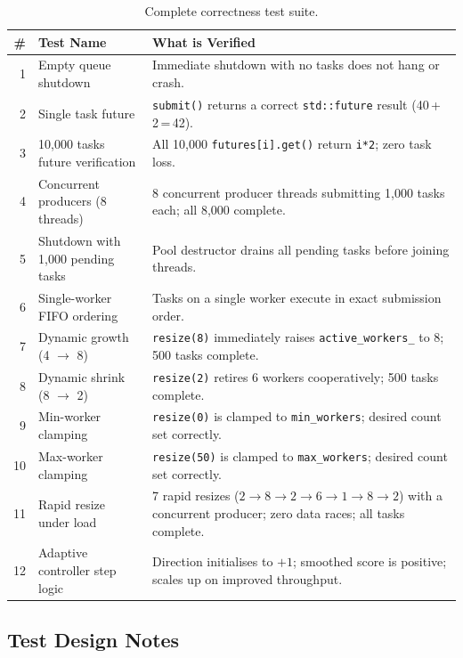 \documentclass[12pt,a4paper]{article}
\begin{document}
\begin{table}[H]
\centering
\caption{Complete correctness test suite.}
\begin{tabular}{rp{5.5cm}p{6cm}}
\toprule
\textbf{\#} & \textbf{Test Name} & \textbf{What is Verified} \\
\midrule
1  & Empty queue shutdown
   & Immediate shutdown with no tasks does not hang or crash. \\
2  & Single task future
   & \texttt{submit()} returns a correct \texttt{std::future} result
     (40\,+\,2\,=\,42). \\
3  & 10,000 tasks future verification
   & All 10,000 \texttt{futures[i].get()} return \texttt{i*2};
     zero task loss. \\
4  & Concurrent producers (8 threads)
   & 8 concurrent producer threads submitting 1,000 tasks each;
     all 8,000 complete. \\
5  & Shutdown with 1,000 pending tasks
   & Pool destructor drains all pending tasks before joining threads. \\
6  & Single-worker FIFO ordering
   & Tasks on a single worker execute in exact submission order. \\
7  & Dynamic growth (4 $\to$ 8)
   & \texttt{resize(8)} immediately raises \texttt{active\_workers\_}
     to 8; 500 tasks complete. \\
8  & Dynamic shrink (8 $\to$ 2)
   & \texttt{resize(2)} retires 6 workers cooperatively;
     500 tasks complete. \\
9  & Min-worker clamping
   & \texttt{resize(0)} is clamped to \texttt{min\_workers};
     desired count set correctly. \\
10 & Max-worker clamping
   & \texttt{resize(50)} is clamped to \texttt{max\_workers};
     desired count set correctly. \\
11 & Rapid resize under load
   & 7 rapid resizes ($2{\to}8{\to}2{\to}6{\to}1{\to}8{\to}2$)
     with a concurrent producer; zero data races; all tasks complete. \\
12 & Adaptive controller step logic
   & Direction initialises to $+1$; smoothed score is positive;
     scales up on improved throughput. \\
\bottomrule
\end{tabular}
\label{tab:tests}
\end{table}

\subsection{Test Design Notes}
\end{document}
